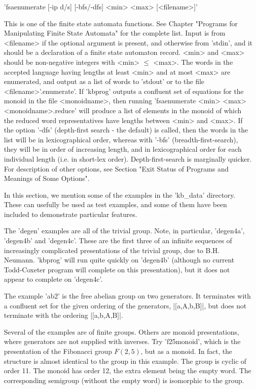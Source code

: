 
'fsaenumerate  [-ip d/s] [-bfs/-dfs] <min> <max> [<filename>]' 

This is one of the finite state automata functions. See Chapter 
"Programs for Manipulating Finite State Automata" for the complete list.
Input is from <filename> if
the optional argument is present, and otherwise from 'stdin', and it
should be a declaration of a finite state automaton record.
<min> and <max> should be non-negative integers with <min> $\le$ <max>.
The words in the accepted language having lengths at least <min> and at
most <max> are enumerated, and output as a list of words to
'stdout' or to the file <filename>'.enumerate'.
If 'kbprog' outputs a confluent set of equations for the monoid in the file
<monoidname>, then running 'fsaenumerate <min> <max> <monoidname>.reduce'
will produce a list of elements in the monoid of which the reduced 
word representatives have lengths between <min> and <max>.
If the option '-dfs' (depth-first search - the default) is called,
then the words
in the list will be in lexicographical order, whereas with '-bfs'
(breadth-first-search), they will be in order of increasing length, and in
lexicographical order for each individual length (i.e. in short-lex order).
Depth-first-search is marginally quicker.
For description of other options, see Section
"Exit Status of Programs and Meanings of Some Options".

In this section, we mention some of the examples in the 'kb\_data' directory.
These can usefully be used as test examples, and some of them have been
included to demonstrate particular features.

The 'degen' examples  are all of the trivial group. Note, in particular,
'degen4a', 'degen4b' and 'degen4c'. These are the first three of an
infinite sequences of increasingly complicated presentations of the
trivial group, due to B.H. Neumann. 'kbprog' will run quite quickly on
'degen4b' (although no current Todd-Coxeter program will complete on this
presentation), but it does not appear to complete on 'degen4c'.

The example 'ab2' is the free abelian group on two generators.
It terminates with a confluent set for the given ordering of the
generators, |[a,A,b,B]|, but does not terminate with the ordering |[a,b,A,B]|.

Several of the examples are of finite groups. 
Others are monoid presentations, where generators are not supplied with
inverses. Try 'f25monoid', which is the presentation of the Fibonacci group
$F(2,5)$, but as a monoid. In fact, the structure is almost identical to
the group in this example. The group is cyclic of order 11.
The monoid has order 12, the extra element being the empty word.
The corresponding semigroup (without the empty word) is isomorphic to the
group.

